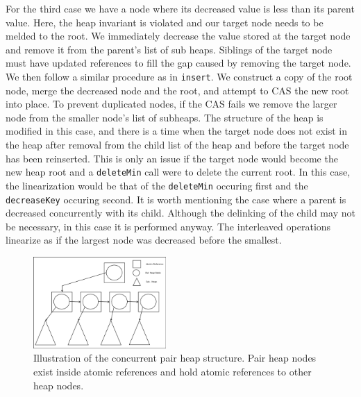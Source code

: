 \documentclass{acm_proc_article-sp}
\begin{document}

For the third case we have a node where its decreased value is less than its parent value.
Here, the heap invariant is violated and our target node needs to be melded to the root.
We immediately decrease the value stored at the target node and remove it from the parent's list
of sub heaps. Siblings of the target node must have updated references to fill the gap caused by removing the target node. 
We then follow a similar procedure as in \texttt{insert}. We construct a copy of the root
node, merge the decreased node and the root, and attempt to CAS the new root into place. To prevent duplicated
nodes, if the CAS fails we remove the larger node from the smaller node's list of subheaps. The structure of the heap is modified in this case, and there is a time when the target node does not exist in the heap after removal from the child list of the heap and before the target node has been reinserted. This is only an issue if the target node would become the new heap root and a \texttt{deleteMin} call were to delete the current root. In this case, the linearization would be that of the \texttt{deleteMin} occuring first and the \texttt{decreaseKey} occuring second. 
It is worth mentioning the case where a parent is decreased concurrently with its child. Although the
delinking of the child may not be necessary, in this case it is performed anyway. The
interleaved operations linearize as if the largest node was decreased before the smallest. 

\begin{figure}
  \includegraphics[width=0.45\textwidth]{img/PairHeapConcurrent-crop.pdf}
  \caption{Illustration of the concurrent pair heap structure. Pair heap nodes exist inside atomic references and hold atomic references to other heap nodes.}
  \label{fig:pairheap:structure}
\end{figure}
\end{document}
